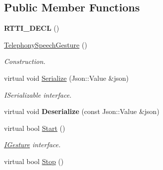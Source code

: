 \subsection*{Public Member Functions}
\begin{DoxyCompactItemize}
\item 
\mbox{\label{class_telephony_speech_gesture_ab16901b59041940a79434d25e94a2daa}} 
{\bfseries R\+T\+T\+I\+\_\+\+D\+E\+CL} ()
\item 
\mbox{\label{class_telephony_speech_gesture_a4e69db6253148a3d2e9745d92a02f577}} 
\hyperlink{class_telephony_speech_gesture_a4e69db6253148a3d2e9745d92a02f577}{Telephony\+Speech\+Gesture} ()
\begin{DoxyCompactList}\small\item\em Construction. \end{DoxyCompactList}\item 
\mbox{\label{class_telephony_speech_gesture_ac0b966a41b816515eb1ba2971b64c804}} 
virtual void \hyperlink{class_telephony_speech_gesture_ac0b966a41b816515eb1ba2971b64c804}{Serialize} (Json\+::\+Value \&json)
\begin{DoxyCompactList}\small\item\em I\+Serializable interface. \end{DoxyCompactList}\item 
\mbox{\label{class_telephony_speech_gesture_a6abc5841ad84c00961ddcae8dbf31590}} 
virtual void {\bfseries Deserialize} (const Json\+::\+Value \&json)
\item 
\mbox{\label{class_telephony_speech_gesture_a268526fcb803568bc1de33eb63f90afc}} 
virtual bool \hyperlink{class_telephony_speech_gesture_a268526fcb803568bc1de33eb63f90afc}{Start} ()
\begin{DoxyCompactList}\small\item\em \hyperlink{class_i_gesture}{I\+Gesture} interface. \end{DoxyCompactList}\item 
\mbox{\label{class_telephony_speech_gesture_a293b3372be769e18ba8de9a0a5c790ea}} 
virtual bool \hyperlink{class_telephony_speech_gesture_a293b3372be769e18ba8de9a0a5c790ea}{Stop} ()

\end{DoxyCompactItemize}
